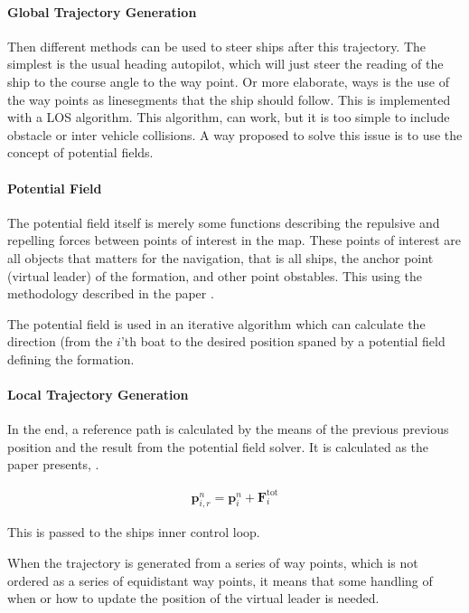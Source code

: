 \paragraph{Global Trajectory Generation}
Then different methods can be used to steer ships after this
trajectory. The simplest is the usual heading autopilot, which will
just steer the reading of the ship to the course angle to the
way point. Or more elaborate, ways is the use of the way points as
linesegments that the ship should follow. This is implemented with a
\ac{LOS} algorithm. This algorithm, can work, but it is too simple to
include obstacle or inter vehicle collisions. A way proposed to solve
this issue is to use the concept of potential fields.

\paragraph{Potential Field}
The potential field itself is merely some functions describing the
repulsive and repelling forces between points of interest in the map.
These points of interest are all objects that matters for the
navigation, that is all ships, the anchor point (virtual leader) of
the formation, and other point obstables. This using the methodology
described in the paper \citep{UAVff3dpf}.

The potential field is used in an iterative algorithm which can
calculate the direction (from the $i$'th boat to the desired position
spaned by a potential field defining the formation.

\paragraph{Local Trajectory Generation}
In the end, a reference path is calculated by the means of the
previous previous position and the result from the potential field
solver. It is calculated as the paper presents, \citep[eq.
48]{UAVff3dpf}.

\begin{align}
	\mathbf{p}_{i,r}^n = \mathbf{p}_i^n + \mathbf{F}_i ^\text{tot}
\end{align}

This is passed to the ships inner control loop.


When the trajectory is generated from a series of way points, which is
not ordered as a series of equidistant way points, it means that some
handling of when or how to update the position of the virtual leader
is needed.

